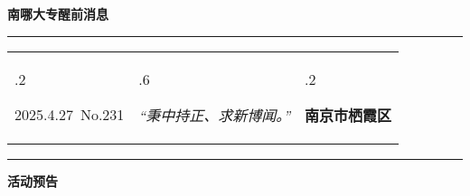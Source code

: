 \documentclass[letterpaper, 12pt]{article}
\begin{document}
\begin{center}
    \Huge\textbf{南哪大专醒前消息}
\end{center}
\vspace{4mm}
\hrule
\renewcommand\tabularxcolumn[1]{m{#1}}
\begin{tabularx}{\textwidth}{>{\hsize.2\hsize}X>{\hsize.6\hsize}X>{\hsize.2\hsize}X}
    \begin{flushleft}
        2025.4.27\, No.231
    \end{flushleft}
    &
    \begin{center}
        \textit{“秉中持正、求新博闻。”}
    \end{center}
    &
    \begin{flushright}
        \textbf{南京市栖霞区}
    \end{flushright}
\end{tabularx}
\vspace{-3.5mm}
\hrule
\vspace{4mm}
\centerline{\huge\textbf{活动预告}}
\end{document}
